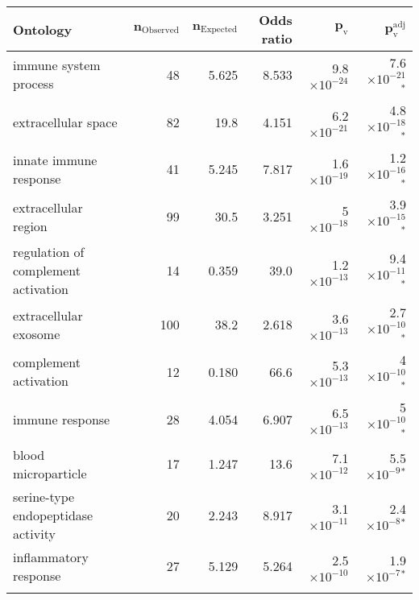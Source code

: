 \documentclass{article}
\begin{document}
    \begin{table*}[!ht]
        \centering
        \begin{adjustbox}{width = 1\textwidth}
            \small
            \begin{tabular}{|l|r|r|r|r|r|}
                \toprule
                \textbf{Ontology} &
                $\bm{n_{\mathrm{Observed}}}$ &
                $\bm{n_{\mathrm{Expected}}}$ &
                \textbf{Odds ratio} &
                $\bm{p_{\mathrm{v}}}$ &
                $\bm{p_{\mathrm{v}}^{\mathrm{adj}}}$ \\
                \midrule
                immune system process                             & 48  & 5.625 & 8.533 & 9.8$\times 10^{-24}$ & 7.6$\times 10^{-21}$$\bm{^*}$ \\
                extracellular space                               & 82  & 19.8  & 4.151 & 6.2$\times 10^{-21}$ & 4.8$\times 10^{-18}$$\bm{^*}$ \\
                innate immune response                            & 41  & 5.245 & 7.817 & 1.6$\times 10^{-19}$ & 1.2$\times 10^{-16}$$\bm{^*}$ \\
                extracellular region                              & 99  & 30.5  & 3.251 & 5$\times 10^{-18}$   & 3.9$\times 10^{-15}$$\bm{^*}$ \\
                regulation of complement activation               & 14  & 0.359 & 39.0  & 1.2$\times 10^{-13}$ & 9.4$\times 10^{-11}$$\bm{^*}$ \\
                extracellular exosome                             & 100 & 38.2  & 2.618 & 3.6$\times 10^{-13}$ & 2.7$\times 10^{-10}$$\bm{^*}$ \\
                complement activation                             & 12  & 0.180 & 66.6  & 5.3$\times 10^{-13}$ & 4$\times 10^{-10}$$\bm{^*}$   \\
                immune response                                   & 28  & 4.054 & 6.907 & 6.5$\times 10^{-13}$ & 5$\times 10^{-10}$$\bm{^*}$   \\
                blood microparticle                               & 17  & 1.247 & 13.6  & 7.1$\times 10^{-12}$ & 5.5$\times 10^{-9}$$\bm{^*}$  \\
                serine-type endopeptidase activity                & 20  & 2.243 & 8.917 & 3.1$\times 10^{-11}$ & 2.4$\times 10^{-8}$$\bm{^*}$  \\
                inflammatory response                             & 27  & 5.129 & 5.264 & 2.5$\times 10^{-10}$ & 1.9$\times 10^{-7}$$\bm{^*}$  \\
$$
\end{tabular}
\end{adjustbox}
\end{table*}
\end{document}
